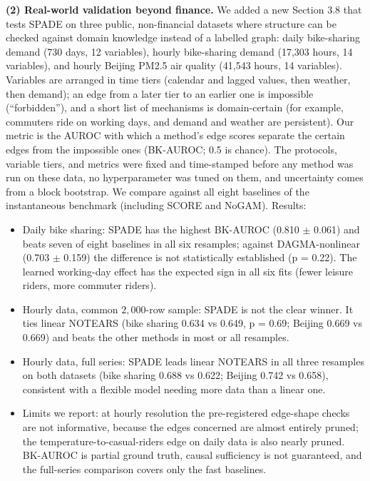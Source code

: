 \documentclass[11pt]{article}
\begin{document}
\textbf{(2) Real-world validation beyond finance.} We added a new Section 3.8 that tests SPADE on three public, non-financial datasets where structure can be checked against domain knowledge instead of a labelled graph: daily bike-sharing demand (730 days, 12 variables), hourly bike-sharing demand (17,303 hours, 14 variables), and hourly Beijing PM2.5 air quality (41,543 hours, 14 variables). Variables are arranged in time tiers (calendar and lagged values, then weather, then demand); an edge from a later tier to an earlier one is impossible (``forbidden''), and a short list of mechanisms is domain-certain (for example, commuters ride on working days, and demand and weather are persistent). Our metric is the AUROC with which a method's edge scores separate the certain edges from the impossible ones (BK-AUROC; 0.5 is chance). The protocols, variable tiers, and metrics were fixed and time-stamped before any method was run on these data, no hyperparameter was tuned on them, and uncertainty comes from a block bootstrap. We compare against all eight baselines of the instantaneous benchmark (including SCORE and NoGAM). Results:
\begin{itemize}
\item Daily bike sharing: SPADE has the highest BK-AUROC (0.810 $\pm$ 0.061) and beats seven of eight baselines in all six resamples; against DAGMA-nonlinear (0.703 $\pm$ 0.159) the difference is not statistically established (p = 0.22). The learned working-day effect has the expected sign in all six fits (fewer leisure riders, more commuter riders).
\item Hourly data, common $2{,}000$-row sample: SPADE is not the clear winner. It ties linear NOTEARS (bike sharing 0.634 vs 0.649, p = 0.69; Beijing 0.669 vs 0.669) and beats the other methods in most or all resamples.
\item Hourly data, full series: SPADE leads linear NOTEARS in all three resamples on both datasets (bike sharing 0.688 vs 0.622; Beijing 0.742 vs 0.658), consistent with a flexible model needing more data than a linear one.
\item Limits we report: at hourly resolution the pre-registered edge-shape checks are not informative, because the edges concerned are almost entirely pruned; the temperature-to-casual-riders edge on daily data is also nearly pruned. BK-AUROC is partial ground truth, causal sufficiency is not guaranteed, and the full-series comparison covers only the fast baselines.
\end{itemize}
\end{document}
